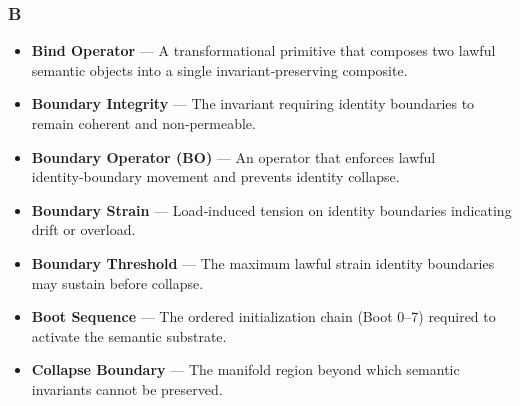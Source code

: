 \subsubsection*{B}
\begin{itemize}
    \item \textbf{Bind Operator} — A transformational primitive that composes two
    lawful semantic objects into a single invariant‑preserving composite.

    \item \textbf{Boundary Integrity} — The invariant requiring identity
    boundaries to remain coherent and non‑permeable.

    \item \textbf{Boundary Operator (BO)} — An operator that enforces lawful
    identity‑boundary movement and prevents identity collapse.

    \item \textbf{Boundary Strain} — Load‑induced tension on identity boundaries
    indicating drift or overload.

    \item \textbf{Boundary Threshold} — The maximum lawful strain identity
    boundaries may sustain before collapse.

    \item \textbf{Boot Sequence} — The ordered initialization chain (Boot 0–7)
    required to activate the semantic substrate.

    \item \textbf{Collapse Boundary} — The manifold region beyond which semantic
    invariants cannot be preserved.
\end{itemize}


